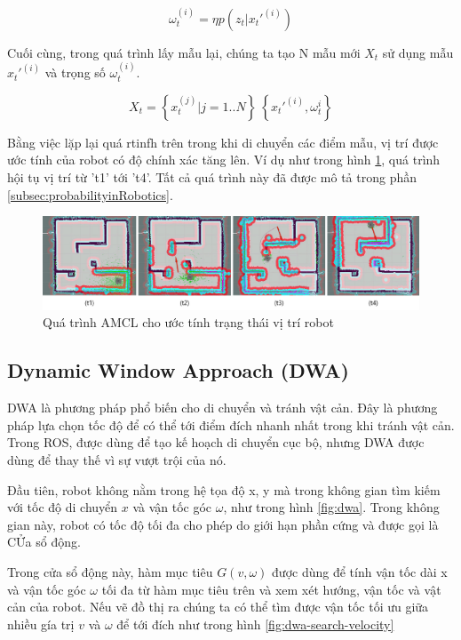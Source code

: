 {{\begin{equation}
  {\omega}_{t}^{(i)} = {\eta}p\left({z}_{t}|{x}_{t}'^{(i)}\right)
\end{equation}

Cuối cùng, trong quá trình lấy mẫu lại, chúng ta tạo N mẫu mới ${X}_{t}$ sử dụng mẫu ${{x}_{t}'}^{(i)}$ và trọng số ${\omega}_{t}^{(i)}$.

\begin{equation}
  X_t = \left\{x_t^{(j)} | j = 1..N\right\} ~  \left\{x_t'^{(i)}, {\omega}_t^{i}\right\}
\end{equation}

Bằng việc lặp lại quá rtinfh trên trong khi di chuyển các điểm mẫu, vị trí được ước tính của robot có độ chính xác tăng lên. Ví dụ như trong hình \figurename{ \ref{fig:AMCLprocess}}, quá trình hội tụ vị trí từ 't1' tới 't4'. Tất cả quá trình này đã được mô tả trong phần \ref{subsec:probabilityinRobotics}. \cite{pyo2017ros}

\begin{figure}[htbp]
  \centering
  \includegraphics[width=1\linewidth]{figures/AMCL-process-for-pose-estimate.png}
  \caption{Quá trình AMCL cho ước tính trạng thái vị trí robot}
  \label{fig:AMCLprocess}
\end{figure}

\subsection{Dynamic Window Approach (DWA)}
DWA là phương pháp phổ biến cho di chuyển và tránh vật cản. Đây là phương pháp lựa chọn tốc độ để có thể tới điểm đích nhanh nhất trong khi tránh vật cản. Trong ROS,  được dùng để tạo kế hoạch di chuyển cục bộ, nhưng DWA được dùng để thay thế vì sự vượt trội của nó.

Đầu tiên, robot không nằm trong hệ tọa độ x, y mà trong không gian tìm kiếm với tốc độ di chuyển $x$ và vận tốc góc $\omega$, như trong hình \figurename{ \ref{fig:dwa}}. Trong không gian này, robot có tốc độ tối đa cho phép do giới hạn phần cứng và được gọi là CỬa sổ động.

Trong cửa sổ động này, hàm mục tiêu $G(v, \omega)$ được dùng để tính vận tốc dài x và vận tốc góc $\omega$ tối đa từ hàm mục tiêu trên và xem xét hướng, vận tốc và vật cản của robot. Nếu vẽ đồ thị ra chúng ta có thể tìm được vận tốc tối ưu giữa nhiều gía trị $v$ và $\omega$ để tới đích như trong hình \figurename{ \ref{fig:dwa-search-velocity}}

}}
